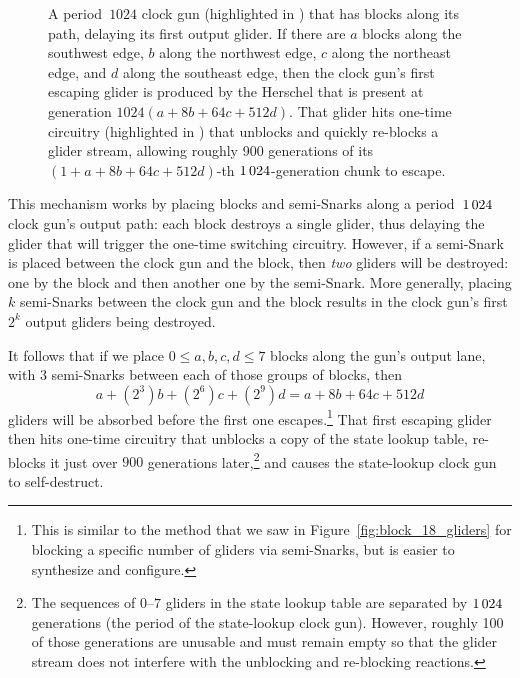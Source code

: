 \begin{figure}[!htb]
	\centering
	\caption{A period~$1024$ clock gun (highlighted in ) that has blocks along its path, delaying its first output glider. If there are $a$ blocks along the southwest edge, $b$ along the northwest edge, $c$ along the northeast edge, and $d$ along the southeast edge, then the clock gun's first escaping glider is produced by the Herschel that is present at generation $1024(a + 8b + 64c + 512d)$. That glider hits one-time circuitry (highlighted in ) that unblocks and quickly re-blocks a glider stream, allowing roughly 900 generations of its $(1 + a + 8b + 64c + 512d)$-th $1{\,}024$-generation chunk to escape.}
	\label{fig:state_lookup_clock_gun}
\end{figure}

This mechanism works by placing blocks and semi-Snarks along a period~$1{\,}024$ clock gun's output path: each block destroys a single glider, thus delaying the glider that will trigger the one-time switching circuitry. However, if a semi-Snark is placed between the clock gun and the block, then \emph{two} gliders will be destroyed: one by the block and then another one by the semi-Snark. More generally, placing $k$ semi-Snarks between the clock gun and the block results in the clock gun's first $2^k$ output gliders being destroyed.

It follows that if we place $0 \leq a,b,c,d \leq 7$ blocks along the gun's output lane, with $3$ semi-Snarks between each of those groups of blocks, then
\[
	a + (2^3)b + (2^6)c + (2^9)d = a + 8b + 64c + 512d
\]
gliders will be absorbed before the first one escapes.\footnote{This is similar to the method that we saw in Figure~\ref{fig:block_18_gliders} for blocking a specific number of gliders via semi-Snarks, but is easier to synthesize and configure.} That first escaping glider then hits one-time circuitry that unblocks a copy of the state lookup table, re-blocks it just over $900$ generations later,\footnote{The sequences of $0$--$7$ gliders in the state lookup table are separated by $1{\,}024$ generations (the period of the state-lookup clock gun). However, roughly 100 of those generations are unusable and must remain empty so that the glider stream does not interfere with the unblocking and re-blocking reactions.} and causes the state-lookup clock gun to self-destruct.



